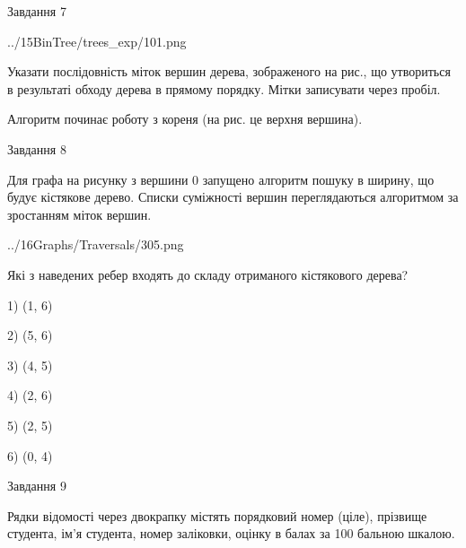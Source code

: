\documentclass[12pt, ukrainian]{article}
\begin{document}
{\vspace{10mm}\par

\newpage
\begin{minipage}[t]{9.7cm}
               
{\begin{center}Завдання {7}\end{center}}
\vspace{-4mm}

\begin{center}
	{../15BinTree/trees_exp/101.png}
\end{center}
Указати послідовність міток вершин дерева, зображеного на рис., що утвориться в результаті обходу дерева в прямому порядку. Мітки записувати через пробіл.\par Алгоритм починає роботу з кореня (на рис. це верхня вершина).\par

\end{minipage}
\vline \hspace{8mm}
\begin{minipage}[t]{8.0cm}
               
{\begin{center}Завдання {8}\end{center}}
\vspace{-4mm}
Для графа на рисунку з вершини 0 запущено алгоритм пошуку в ширину, що будує кістякове дерево. Списки суміжності вершин переглядаються алгоритмом за зростанням міток вершин.\par
\begin{center}
	{../16Graphs/Traversals/305.png}
\end{center}
\par Які з наведених ребер входять до складу отриманого кістякового дерева?\par
1) (1, 6)\par
2) (5, 6)\par
3) (4, 5)\par
4) (2, 6)\par
5) (2, 5)\par
6) (0, 4)\par
{\vskip 15pt} \par

\end{minipage}

               
{\begin{center}Завдання {9}\end{center}}
\vspace{-4mm}
Рядки відомості через двокрапку містять порядковий номер (ціле), пріз\-ви\-ще студен\-та, ім'я студента, номер заліковки, оцінку в балах за 100 бальною шкалою.

}
\end{document}
